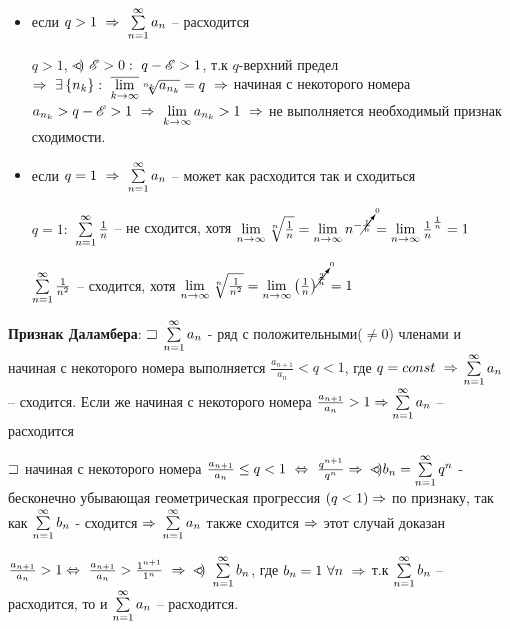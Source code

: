 \begin{proofs}
\begin{enumerate*}
\begin{itemize}
			\item если $q > 1 \ \sledue \ \summa{n=1}{\infty}a_n$ -- расходится
			\begin{dokvo}
				$q > 1$, $\mkern3mu\circ\mkern-19mu<\mkern-4mu) \ \mathscr{E} > 0: \ q - \mathscr{E} > 1$, т.к $q$-верхний предел $\sledue \ \exists \fskobk{n_k}: \ \overline{\predel{k\to\infty}}\sqrt[n_k]{a_{n_k}} = q \ \sledue$ начиная с некоторого номера $a_{n_k} > q - \epsilon > 1 \ \sledue \ \predel{k \to \infty}a_{n_k} >1 \ \sledue$ не выполняется необходимый признак сходимости.
			\end{dokvo}

			\item если $q = 1 \ \sledue \ \summa{n=1}{\infty}a_n$ -- может как расходится так и сходиться
			\begin{dokvo}
				$q = 1: $ $\sum\limits_{n=1}^{\infty}\frac{1}{n}$ --  не сходится, хотя $\lim\limits_{n \to \infty}\sqrt[n]{\frac{1}{n}} = \lim\limits_{n \to \infty}n^{- \cancelto{0}{\frac{1}{n}}} = \lim\limits_{n\to\infty}\frac{1}{n}^{\frac{1}{n}}= 1$

				$\sum\limits_{n=1}^{\infty}\frac{1}{n^{2}}$ -- сходится, хотя $\lim\limits_{n \to \infty}\sqrt[n]{\frac{1}{n^{2}}} = \lim\limits_{n \to \infty}\left( \frac{1}{n}\right)^{\cancelto{0}{\frac{2}{n}}} = 1$
			\end{dokvo}
		\end{itemize}

		\item \textbf{Признак Даламбера}:
		$\sqsupset$ $\sum\limits_{n=1}^{\infty}a_n$ - ряд с положительными($\neq 0$) членами и начиная с некоторого номера выполняется $\frac{a_{n+1}}{a_n} < q < 1$, где $q = const \ \Rightarrow$ $\sum\limits_{n=1}^{\infty}a_n$ -- сходится. Если же начиная с некоторого номера $\frac{a_{n+1}}{a_n} > 1 \Rightarrow \sum\limits_{n=1}^{\infty}a_n$ -- расходится
		\begin{dokvo}
			$\sqsupset$ начиная с некоторого номера $\frac{a_{n+1}}{a_n}\leq q < 1 \ \tittg \ \frac{q^{n+1}}{q^{n}} \sledue \ \rassmotr b_n = \summa{n=1}{\infty}q^{n}$ - бесконечно убывающая геометрическая прогрессия $\left( q < 1\right) \Rightarrow$ по признаку, так как $\sum\limits_{n=1}^{\infty}b_n$ - сходится $\Rightarrow$ $\sum\limits_{n=1}^{\infty}a_n$ также сходится $\Rightarrow$ этот случай доказан

			$\frac{a_{n+1}}{a_n} > 1 \tittg \ \frac{a_{n+1}}{a_n} > \frac{1^{n+1}}{1^{n}} \ \sledue \ \rassmotr \ \summa{n=1}{\infty}b_n$, где $b_n = 1 \ \forall n \ \sledue$ т.к $\sum\limits_{n = 1}^{\infty}b_n$ -- расходится, то и $\sum\limits_{n = 1}^{\infty}a_n$ -- расходится.
		\end{dokvo}
	\end{enumerate*}
\end{proofs}

